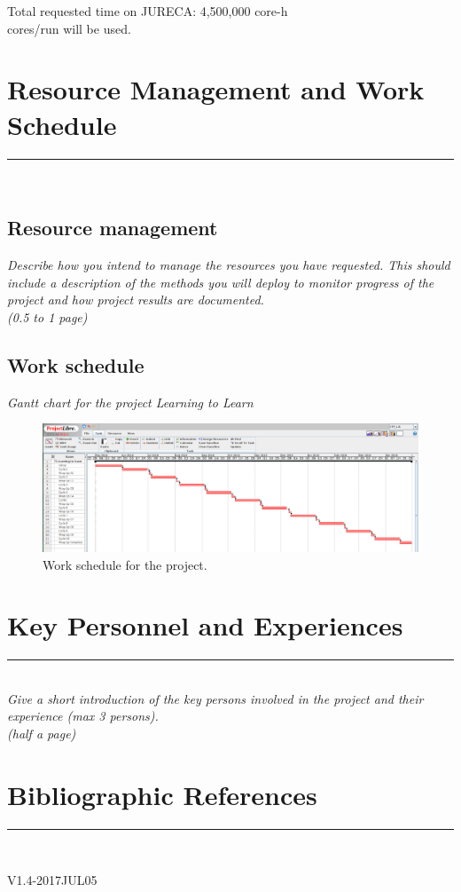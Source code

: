 \documentclass [a4paper, 12pt]{article}
\begin{document}
\noindent Total requested time on JURECA: {\tt } 4,500,000 core-h\\
 cores/run will be used.\\


\section{Resource Management and Work Schedule}
\rule{\textwidth}{0.4pt}\\
\subsection{Resource management}
\textit{Describe how you intend to manage the resources you have requested. This should include a description of the methods you will deploy to monitor progress of the project and how project results are documented.}\\

\textit{(0.5 to 1 page)}

\subsection{Work schedule}

\bigskip
\textit{Gantt chart for the project Learning to Learn}
\begin{figure}[H]
\begin{flushleft}
 \includegraphics[scale=0.25]{Figures/gantt_chart.jpg}
\end{flushleft}
 \caption{\label{fig_workschedule}Work schedule for the project.}
\end{figure}

\section{Key Personnel and Experiences}
\rule{\textwidth}{0.4pt}\\
\textit{Give a short introduction of the key persons involved in the project and their experience (max 3 persons).}\\

\textit{(half a page)}
\newpage

\section{Bibliographic References}
\rule{\textwidth}{0.4pt}\\



\bigskip
\begin{flushright}
{\tiny V1.4-2017JUL05}
\end{flushright}
\end{document}
